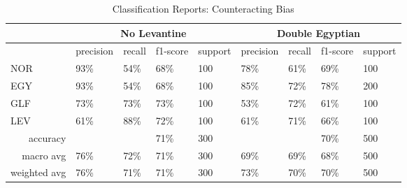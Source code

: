 \begin{table}
    \centering
    \caption{Classification Reports: Counteracting Bias}
    \begin{tabular}{|l|l|l|l|l|l|l|l|l|} 
    \hline
                                              & \multicolumn{4}{c|}{No Levantine}                 & \multicolumn{4}{c|}{Double Egyptian}               \\ 
    \hline
                                              & precision& recall&f1-score& support &precision&recall&f1-score&support\\ 
    \hline
    NOR                                       & 93\%          & 54\%     & 68\%         & 100     & 78\%          & 61\%     & 69\%         & 100      \\ 
    \hline
    EGY                                       & 93\%          & 54\%     & 68\%         & 100     & 85\%          & 72\%     & 78\%         & 200      \\ 
    \hline
    GLF                                       & 73\%          & 73\%     & 73\%         & 100     & 53\%          & 72\%     & 61\%         & 100      \\ 
    \hline
    LEV                                       & 61\%          & 88\%     & 72\%         & 100     & 61\%          & 71\%     & 66\%         & 100      \\ 
    \hline
    \multicolumn{1}{|r|}{accuracy}        &               &          & 71\%         & 300     &               &          & 70\%         & 500      \\ 
    \hline
    \multicolumn{1}{|r|}{macro avg}       & 76\%          & 72\%     & 71\%         & 300     & 69\%          & 69\%     & 68\%         & 500      \\ 
    \hline
    \multicolumn{1}{|r|}{weighted avg} & 76\%          & 71\%     & 71\%         & 300     & 73\%          & 70\%     & 70\%         & 500      \\
    \hline
    \end{tabular}
    \end{table}


    \begin{figure}[h!]
    \end{figure}

